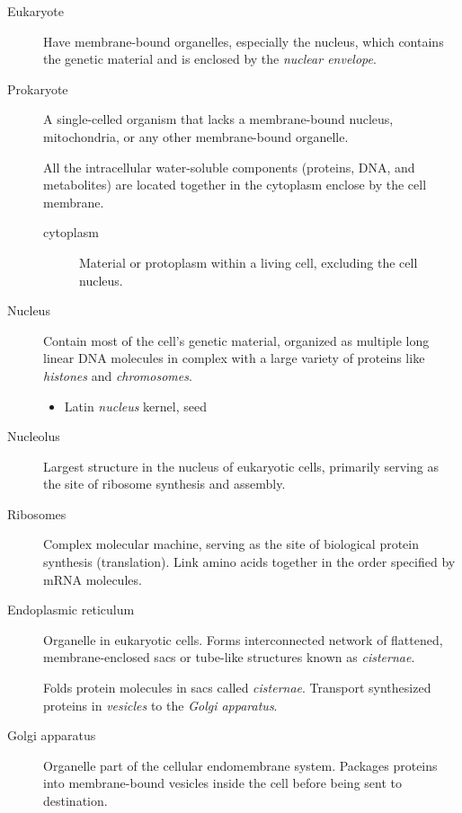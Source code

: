 \documentclass[11pt]{article}
\begin{document}
\begin{description}
\item[{Eukaryote}] Have membrane-bound organelles, especially the nucleus, which
contains the genetic material and is enclosed by the \emph{nuclear
envelope}.

\item[{Prokaryote}] A single-celled organism that lacks a membrane-bound
nucleus, mitochondria, or any other membrane-bound organelle.

All the intracellular water-soluble components (proteins, DNA, and
metabolites) are located together in the cytoplasm enclose by the cell
membrane.

\begin{description}
\item[{cytoplasm}] Material or protoplasm within a living cell, excluding the
cell nucleus.
\end{description}

\item[{Nucleus}] Contain most of the cell's genetic material, organized as
multiple long linear DNA molecules in complex with a large variety of
proteins like \emph{histones} and \emph{chromosomes}.

\begin{itemize}
\item Latin \emph{nucleus} kernel, seed
\end{itemize}

\item[{Nucleolus}] Largest structure in the nucleus of eukaryotic cells,
primarily serving as the site of ribosome synthesis and assembly.

\item[{Ribosomes}] Complex molecular machine, serving as the site of biological
protein synthesis (translation). Link amino acids together in the order
specified by mRNA molecules.

\item[{Endoplasmic reticulum}] Organelle in eukaryotic cells. Forms
interconnected network of flattened, membrane-enclosed sacs or
tube-like structures known as \emph{cisternae}. 

Folds protein molecules in sacs called \emph{cisternae}. Transport
synthesized proteins in \emph{vesicles} to the \emph{Golgi apparatus}.

\item[{Golgi apparatus}] Organelle part of the cellular endomembrane system.
Packages proteins into membrane-bound vesicles inside the cell before
being sent to destination.


\end{description}
\end{document}
